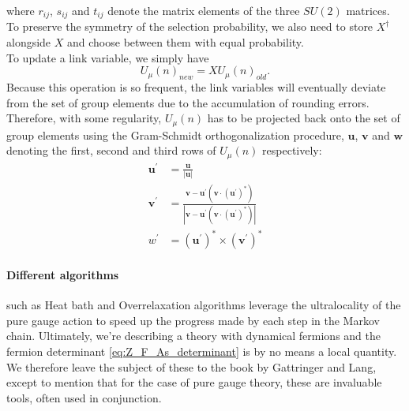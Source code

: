 \documentclass[a4paper,10pt]{article}
\begin{document}
where $r_{ij}$, $s_{ij}$ and $t_{ij}$ denote the matrix elements of the three $SU(2)$ matrices. To preserve the symmetry of the selection probability, we also need to store $X^\dagger$ alongside $X$ and choose between them with equal probability.\\To update a link variable, we simply have
\begin{equation}
U_\mu(n)_{new}= XU_\mu(n)_{old}.
\end{equation}
Because this operation is so frequent, the link variables will eventually deviate from the set of group elements due to the accumulation of rounding errors. Therefore, with some regularity, $U_\mu(n)$ has to be projected back onto the set of group elements using the Gram-Schmidt orthogonalization procedure, $\boldsymbol{u}$, $\boldsymbol{v}$ and $\boldsymbol{w}$ denoting the first, second and third rows of $U_\mu(n)$ respectively:
\begin{equation}
\begin{aligned}
\boldsymbol{u}^\prime &=\frac{\boldsymbol{u}}{|\boldsymbol{u}| }\\
\boldsymbol{v}^\prime &=\frac{\boldsymbol{v}-\boldsymbol{u}^\prime\left(\boldsymbol{v} \cdot (\boldsymbol{u}^\prime)^{*}\right)}{\left|\boldsymbol{v}-\boldsymbol{u}^\prime\left(\boldsymbol{v} \cdot (\boldsymbol{u}^\prime)^{*}\right)\right|}\\ w^\prime &=(\boldsymbol{u}^\prime)^{*}\times(\boldsymbol{v}^\prime)^{*}
\end{aligned}
\end{equation}
\paragraph{Different algorithms} such as Heat bath and Overrelaxation algorithms leverage the ultralocality of the pure gauge action to speed up the progress made by each step in the Markov chain. Ultimately, we're describing a theory with dynamical fermions and the fermion determinant \eqref{eq:Z_F_As_determinant} is by no means a local quantity. We therefore leave the subject of these to the book by Gattringer and Lang\cite{Gattringer:2010zz}, except to mention that for the case of pure gauge theory, these are invaluable tools, often used in conjunction.
\end{document}

